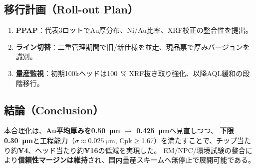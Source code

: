 \documentclass[conference]{IEEEtran}
\begin{document}
\subsection{移行計画（Roll-out Plan）}
\begin{enumerate}
  \item \textbf{PPAP}：代表3ロットでAu厚分布、Ni/Au比率、XRF校正の整合性を提出。
  \item \textbf{ライン切替}：二重管理期間で旧/新仕様を並走、現品票で厚みバージョンを識別。
  \item \textbf{量産監視}：初期100kヘッドは\SI{100}{\%} XRF抜き取り強化、以降AQL緩和の段階移行。
\end{enumerate}

\subsection{結論（Conclusion）}
本合理化は、\textbf{Au平均厚みを\SI{0.50}{\micro\meter} $\rightarrow$ \SI{0.425}{\micro\meter}}へ見直しつつ、
\textbf{下限\SI{0.30}{\micro\meter}}と工程能力（$\sigma\!\approx\!\SI{0.025}{\micro\meter}$, Cpk$\ge$1.67）を満たすことで、チップ当たり約\textbf{¥4}、ヘッド当たり約\textbf{¥16}の低減を実現した。
EM/NPC/環境試験の整合により\textbf{信頼性マージンは維持}され、国内量産スキームへ無停止で展開可能である。
\end{document}
